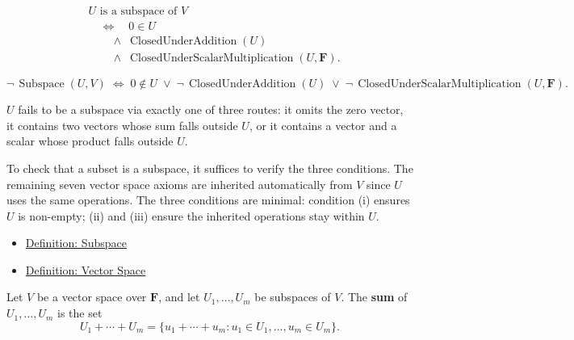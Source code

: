 \begin{remark*}
\[
\begin{aligned}
&U \text{ is a subspace of } V \\
&\quad\Longleftrightarrow\quad
0 \in U \\
&\qquad\land\;
\operatorname{ClosedUnderAddition}(U) \\
&\qquad\land\;
\operatorname{ClosedUnderScalarMultiplication}(U,\mathbf{F}).
\end{aligned}
\]
\end{remark*}

\begin{remark*}
\[
\neg\,\operatorname{Subspace}(U,V)
\;\Longleftrightarrow\;
0 \notin U
\;\vee\;
\neg\,\operatorname{ClosedUnderAddition}(U)
\;\vee\;
\neg\,\operatorname{ClosedUnderScalarMultiplication}(U,\mathbf{F}).
\]
\end{remark*}

\begin{remark*}
$U$ fails to be a subspace via exactly one of three routes: it omits the zero
vector, it contains two vectors whose sum falls outside $U$, or it contains a
vector and a scalar whose product falls outside $U$.
\end{remark*}

\begin{remark*}[Interpretation]
To check that a subset is a subspace, it suffices to verify the three
conditions. The remaining seven vector space axioms are inherited automatically
from $V$ since $U$ uses the same operations. The three conditions are minimal:
condition (i) ensures $U$ is non-empty; (ii) and (iii) ensure the inherited
operations stay within $U$.
\end{remark*}

\begin{remark*}[Dependencies]
\begin{itemize}
  \item \hyperref[def:subspace]{Definition: Subspace}
  \item \hyperref[def:vector-space]{Definition: Vector Space}
\end{itemize}
\end{remark*}


\begin{tcolorbox}[colback=defbox, colframe=defborder, arc=2pt,
  left=6pt, right=6pt, top=4pt, bottom=4pt,
  title={\small\textbf{Definition (Sum of Subspaces)}},
  fonttitle=\small\bfseries]
\begin{definition}
\label{def:sum-of-subspaces}
Let $V$ be a vector space over $\mathbf{F}$, and let
$U_1,\dots,U_m$ be subspaces of $V$.
The \textbf{sum} of $U_1,\dots,U_m$ is the set
\[
U_1+\cdots+U_m
=
\{u_1+\cdots+u_m : u_1 \in U_1,\dots,u_m \in U_m\}.
\]
\end{definition}
\end{tcolorbox}

